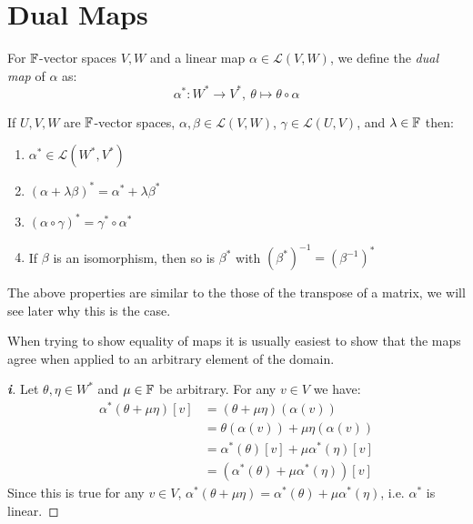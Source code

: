 \documentclass[../main.tex]{subfiles}
\begin{document}
\section{Dual Maps}
\begin{definition}
  For $\mathbb{F}$-vector spaces $V, W$ and a linear map $\alpha \in \mathcal{L}(V, W)$, we define the \textit{dual map} of $\alpha$ as:
  \[
    \alpha^{*}: W^{*} \to V^{*},\ \theta \mapsto \theta \circ \alpha
  \]
\end{definition}
\begin{lemma}
  If $U, V, W$ are $\mathbb{F}$-vector spaces, $\alpha, \beta \in \mathcal{L}(V, W)$, $\gamma \in \mathcal{L}(U, V)$, and $\lambda \in \mathbb{F}$ then:
  \begin{enumerate}
    \item $\alpha^{*} \in \mathcal{L}(W^{*}, V^{*})$
    \item $(\alpha + \lambda \beta)^{*} = \alpha^{*} + \lambda \beta^{*}$
    \item $(\alpha \circ \gamma)^{*} = \gamma^{*} \circ \alpha^{*}$
    \item If $\beta$ is an isomorphism, then so is $\beta^{*}$ with $(\beta^{*})^{-1} = (\beta^{-1})^{*}$
  \end{enumerate}
\end{lemma}
\begin{remark}
  The above properties are similar to the those of the transpose of a matrix, we will see later why this is the case.
\end{remark}
\begin{remark}[Advice]
  When trying to show equality of maps it is usually easiest to show that the maps agree when applied to an arbitrary element of the domain.
\end{remark}
\begin{proof}[\textbf{i}]
  Let $\theta, \eta \in W^{*}$ and $\mu \in \mathbb{F}$ be arbitrary.
  For any $v \in V$ we have:
  \begin{align*}
    \alpha^{*}(\theta + \mu \eta)[v] &= (\theta + \mu \eta)(\alpha(v)) \\
                                     &= \theta(\alpha(v)) + \mu \eta(\alpha(v)) \\
                                     &= \alpha^{*}(\theta)[v] + \mu \alpha^{*}(\eta)[v] \\
                                     &= (\alpha^{*}(\theta) + \mu \alpha^{*}(\eta))[v]
  \end{align*}
  Since this is true for any $v \in V$, $\alpha^{*}(\theta + \mu \eta) = \alpha^{*}(\theta) + \mu \alpha^{*}(\eta)$, i.e. $\alpha^{*}$ is linear.
\end{proof}
\end{document}
